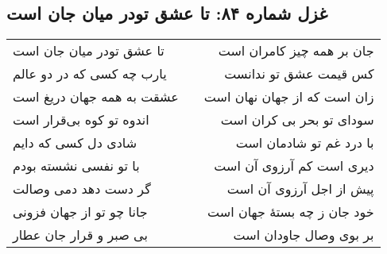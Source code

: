 \begin{center}
\section*{غزل شماره ۸۴: تا عشق تودر میان جان است}
\label{sec:084}
\begin{longtable}{l p{0.5cm} r}
تا عشق تودر میان جان است
&&
جان بر همه چیز کامران است
\\
یارب چه کسی که در دو عالم
&&
کس قیمت عشق تو ندانست
\\
عشقت به همه جهان دریغ است
&&
زان است که از جهان نهان است
\\
اندوه تو کوه بی‌قرار است
&&
سودای تو بحر بی کران است
\\
شادی دل کسی که دایم
&&
با درد غم تو شادمان است
\\
با تو نفسی نشسته بودم
&&
دیری است کم آرزوی آن است
\\
گر دست دهد دمی وصالت
&&
پیش از اجل آرزوی آن است
\\
جانا چو تو از جهان فزونی
&&
خود جان ز چه بستهٔ جهان است
\\
بی صبر و قرار جان عطار
&&
بر بوی وصال جاودان است
\\
\end{longtable}
\end{center}
